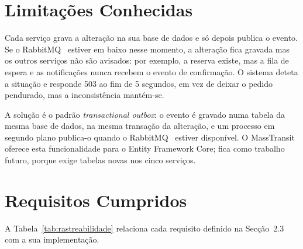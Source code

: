 \section{Limitações Conhecidas}
\label{sec:limitacoes}

Cada serviço grava a alteração na sua base de dados e só depois publica o evento. Se o RabbitMQ~\cite{rabbitmq}
estiver em baixo nesse momento, a alteração fica gravada mas os outros serviços não são avisados:
por exemplo, a reserva existe, mas a fila de espera e as notificações nunca recebem o evento de
confirmação. O sistema deteta a situação e responde 503 ao fim de 5 segundos, em vez de deixar
o pedido pendurado, mas a inconsistência mantém-se.

A solução é o padrão \textit{transactional outbox}: o evento é gravado numa tabela da mesma base de
dados, na mesma transação da alteração, e um processo em segundo plano publica-o quando o
RabbitMQ~\cite{rabbitmq} estiver disponível. O MassTransit oferece esta funcionalidade para o Entity Framework
Core; fica como trabalho futuro, porque exige tabelas novas nos cinco serviços.

\section{Requisitos Cumpridos}

A Tabela~\ref{tab:rastreabilidade} relaciona cada requisito definido na Secção~2.3 com a sua
implementação.

